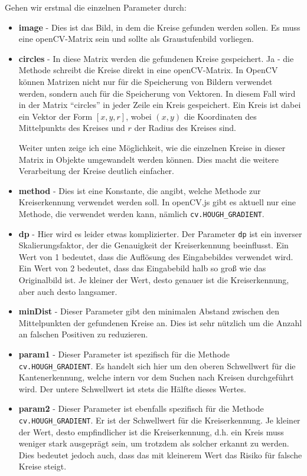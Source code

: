 Gehen wir erstmal die einzelnen Parameter durch:
\begin{itemize}[label={}]
    \item \textbf{image} - Dies ist das Bild, in dem die Kreise gefunden werden sollen. Es muss eine openCV-Matrix sein und sollte als Graustufenbild vorliegen.
    \item \textbf{circles} - In diese Matrix werden die gefundenen Kreise gespeichert. Ja - die Methode schreibt die Kreise direkt in eine openCV-Matrix. In OpenCV können Matrizen nicht nur für die Speicherung von Bildern verwendet werden, sondern auch für die Speicherung von Vektoren. In diesem Fall wird in der Matrix \enquote{circles} in jeder Zeile ein Kreis gespeichert. Ein Kreis ist dabei ein Vektor der Form \([x, y, r]\), wobei \((x, y)\) die Koordinaten des Mittelpunkts des Kreises und \(r\) der Radius des Kreises sind.
    
    Weiter unten zeige ich eine Möglichkeit, wie die einzelnen Kreise in dieser Matrix in Objekte umgewandelt werden können. Dies macht die weitere Verarbeitung der Kreise deutlich einfacher.
    \item \textbf{method} - Dies ist eine Konstante, die angibt, welche Methode zur Kreiserkennung verwendet werden soll. In openCV.js gibt es aktuell nur eine Methode, die verwendet werden kann, nämlich \texttt{cv.HOUGH\_GRADIENT}.
    \item \textbf{dp} - Hier wird es leider etwas komplizierter. Der Parameter \texttt{dp} ist ein inverser Skalierungsfaktor, der die Genauigkeit der Kreiserkennung beeinflusst. Ein Wert von 1 bedeutet, dass die Auflösung des Eingabebildes verwendet wird. Ein Wert von 2 bedeutet, dass das Eingabebild halb so groß wie das Originalbild ist. Je kleiner der Wert, desto genauer ist die Kreiserkennung, aber auch desto langsamer. 
    \item \textbf{minDist} - Dieser Parameter gibt den minimalen Abstand zwischen den Mittelpunkten der gefundenen Kreise an. Dies ist sehr nützlich um die Anzahl an falschen Positiven zu reduzieren. 
    \item \textbf{param1} - Dieser Parameter ist spezifisch für die Methode \texttt{cv.HOUGH\_GRADIENT}. Es handelt sich hier um den oberen Schwellwert für die Kantenerkennung, welche intern vor dem Suchen nach Kreisen durchgeführt wird. Der untere Schwellwert ist stets die Hälfte dieses Wertes.
    \item \textbf{param2} - Dieser Parameter ist ebenfalls spezifisch für die Methode \texttt{cv.HOUGH\_GRADIENT}. Er ist der Schwellwert für die Kreiserkennung. Je kleiner der Wert, desto empfindlicher ist die Kreiserkennung, d.h. ein Kreis muss weniger stark ausgeprägt sein, um trotzdem als solcher erkannt zu werden. Dies bedeutet jedoch auch, dass das mit kleinerem Wert das Risiko für falsche Kreise steigt.
\end{itemize}


